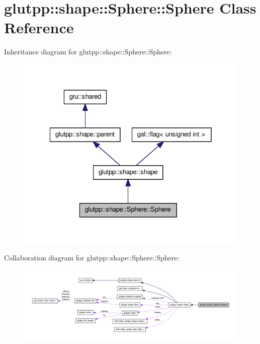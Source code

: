 \hypertarget{classglutpp_1_1shape_1_1Sphere_1_1Sphere}{\section{glutpp\-:\-:shape\-:\-:\-Sphere\-:\-:\-Sphere \-Class \-Reference}
\label{classglutpp_1_1shape_1_1Sphere_1_1Sphere}
}


\-Inheritance diagram for glutpp\-:\-:shape\-:\-:\-Sphere\-:\-:\-Sphere\-:\nopagebreak
\begin{figure}[H]
\begin{center}
\leavevmode
\includegraphics[width=328pt]{classglutpp_1_1shape_1_1Sphere_1_1Sphere__inherit__graph}
\end{center}
\end{figure}


\-Collaboration diagram for glutpp\-:\-:shape\-:\-:\-Sphere\-:\-:\-Sphere\-:\nopagebreak
\begin{figure}[H]
\begin{center}
\leavevmode
\includegraphics[width=350pt]{classglutpp_1_1shape_1_1Sphere_1_1Sphere__coll__graph}
\end{center}
\end{figure}
